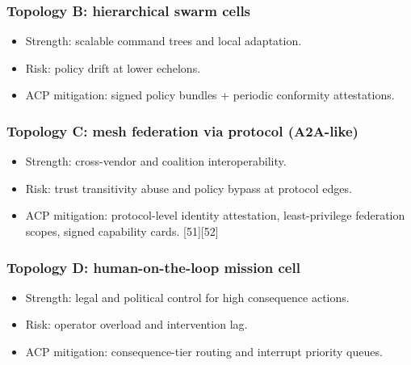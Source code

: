 \documentclass[
]{article}
\providecommand{\tightlist}{%
  \setlength{\itemsep}{0pt}\setlength{\parskip}{0pt}}
\begin{document}
\hypertarget{topology-b-hierarchical-swarm-cells}{%
\subsubsection{Topology B: hierarchical swarm
cells}\label{topology-b-hierarchical-swarm-cells}}

\begin{itemize}
\tightlist
\item
  Strength: scalable command trees and local adaptation.
\item
  Risk: policy drift at lower echelons.
\item
  ACP mitigation: signed policy bundles + periodic conformity
  attestations.
\end{itemize}

\hypertarget{topology-c-mesh-federation-via-protocol-a2a-like}{%
\subsubsection{Topology C: mesh federation via protocol
(A2A-like)}\label{topology-c-mesh-federation-via-protocol-a2a-like}}

\begin{itemize}
\tightlist
\item
  Strength: cross-vendor and coalition interoperability.
\item
  Risk: trust transitivity abuse and policy bypass at protocol edges.
\item
  ACP mitigation: protocol-level identity attestation, least-privilege
  federation scopes, signed capability cards. {[}51{]}{[}52{]}
\end{itemize}

\hypertarget{topology-d-human-on-the-loop-mission-cell}{%
\subsubsection{Topology D: human-on-the-loop mission
cell}\label{topology-d-human-on-the-loop-mission-cell}}

\begin{itemize}
\tightlist
\item
  Strength: legal and political control for high consequence actions.
\item
  Risk: operator overload and intervention lag.
\item
  ACP mitigation: consequence-tier routing and interrupt priority
  queues.
\end{itemize}
\end{document}
